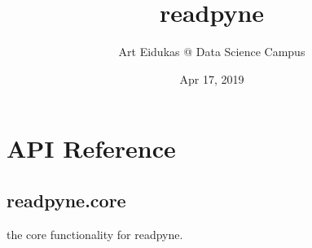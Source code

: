 \documentclass[letterpaper,10pt,english]{sphinxmanual}
\title{readpyne}
\date{Apr 17, 2019}
\author{Art Eidukas @ Data Science Campus}
\begin{document}
\pagestyle{empty}
\sphinxmaketitle
\pagestyle{plain}
\sphinxtableofcontents
\pagestyle{normal}
\label{\detokenize{index::doc}}



\chapter{API Reference}
\label{\detokenize{api:module-readpyne.core}}\label{\detokenize{api:api-reference}}\label{\detokenize{api::doc}}

\section{readpyne.core}
\label{\detokenize{api:readpyne-core}}
the core functionality for readpyne.
\end{document}
